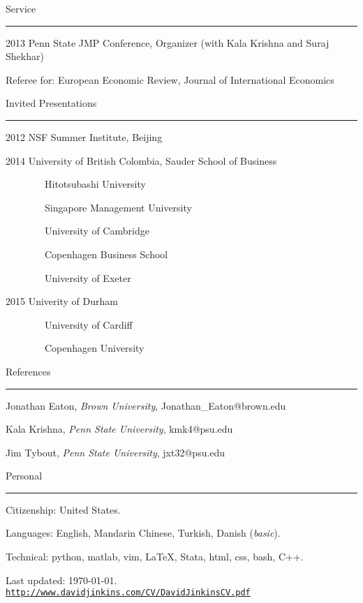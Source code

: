 \documentclass[letterpaper]{article}
\def\footerlink{http://www.davidjinkins.com/CV/DavidJinkinsCV.pdf}
\renewenvironment{itemize}{
    \begin{list}{}{
            \setlength{\leftmargin}{1.5em}
            \setlength{\parskip}{0pt}
            \setlength{\parsep}{0pt}
        }
    }{
    \end{list}
}
\begin{document}
\vspace{4mm}
{\Large Service}
\vspace{1mm}
\hrule
\begin{itemize}
    \item 2013 Penn State JMP Conference, Organizer (with Kala Krishna and Suraj Shekhar)
    \item Referee for: European Economic Review, Journal of International Economics
\end{itemize}

\vspace{4mm}
{\Large Invited Presentations}
\vspace{1mm}
\hrule
\begin{itemize}
    \item 2012 NSF Summer Institute, Beijing
    \item 2014 University of British Colombia, Sauder School of Business
    \item \ \ \ \ \ \ \ \ Hitotsubashi University
    \item \ \ \ \ \ \ \ \ Singapore Management University 
    \item \ \ \ \ \ \ \ \ University of Cambridge
    \item \ \ \ \ \ \ \ \ Copenhagen Business School 
    \item \ \ \ \ \ \ \ \ University of Exeter
    \item 2015 Univerity of Durham
    \item \ \ \ \ \ \ \ \ University of Cardiff
    \item \ \ \ \ \ \ \ \ Copenhagen University
\end{itemize}

\vspace{4mm}
{\Large References}
\vspace{1mm}
\hrule
\begin{itemize}
    \item Jonathan Eaton, \emph{Brown University}, Jonathan\_Eaton@brown.edu
    \item Kala Krishna, \emph{Penn State University}, kmk4@psu.edu
    \item Jim Tybout, \emph{Penn State University}, jxt32@psu.edu 
\end{itemize}

\vspace{7mm}
{\Large Personal}
\vspace{1mm}
\hrule

\begin{itemize}
    \item Citizenship: United States.
    \item Languages: English, Mandarin Chinese, Turkish, Danish (\emph{basic}).
    \item Technical: python, matlab, vim, \LaTeX, Stata, html, css, bash, C++.
\end{itemize}

\begin{center}
    \begin{footnotesize}
        Last updated: \today .\\
        \href{\footerlink}{\texttt{\footerlink}}
    \end{footnotesize}
\end{center}
\end{document}
